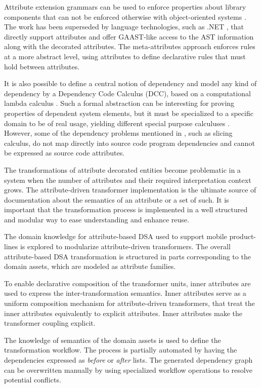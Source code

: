 Attribute extension grammars can be used to enforce properties about library components that can not be enforced otherwise with object-oriented systems \cite{hedin.97}. The work has been superseded by language technologies, such as .NET \cite{www.dotnet}, that directly support attributes and offer GAAST-like access to the AST information along with the decorated attributes. The meta-attributes approach enforces rules at a more abstract level, using attributes to define declarative rules that must hold between attributes.

It is also possible to define a central notion of dependency and model any kind of dependency by a Dependency Code Calculus (DCC), based on a computational lambda calculus \cite{abadi99core}. Such a formal abstraction can be interesting for proving properties of dependent system elements, but it must be specialized to a specific domain to be of real usage, yielding different special purpose calculuses \cite{abadi99core}. However, some of the dependency problems mentioned in \cite{abadi99core}, such as slicing calculus, do not map directly into source code program dependencies and cannot be expressed as source code attributes.


The transformations of attribute decorated entities become problematic in a system when the number of attributes and their required interpretation context grows. The attribute-driven transformer implementation is the ultimate source of documentation about the semantics of an attribute or a set of such. It is important that the transformation process is implemented in a well structured and modular way to ease understanding and enhance reuse.

The domain knowledge for attribute-based DSA used to support mobile product-lines is explored to modularize attribute-driven transformers. The overall attribute-based DSA transformation is structured in parts corresponding to the domain assets, which are modeled as attribute families.

To enable declarative composition of the transformer units, inner attributes are used to express the inter-transformation semantics. Inner attributes serve as a uniform composition mechanism for attribute-driven transformers, that treat the inner attributes equivalently to explicit attributes. Inner attributes make the transformer coupling explicit.

The knowledge of semantics of the domain assets is used to define the transformation workflow. The process is partially automated by having the dependencies expressed as \textit{before} or \textit{after} lists. The generated dependency graph can be overwritten manually by using specialized workflow operations to resolve potential conflicts.

